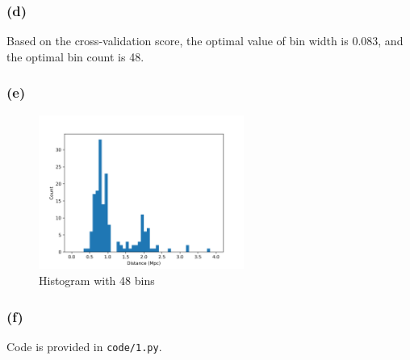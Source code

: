 \subsubsection*{(d)}
Based on the cross-validation score, the optimal value of bin width is 0.083, and the optimal bin count is 48.

\subsubsection*{(e)}
\vspace{-30pt}
\begin{figure}[H]
	\centering
	\includegraphics[width=0.6\textwidth]{images/optimalhistogram.png}
	\caption{Histogram with 48 bins}
\end{figure}

\subsubsection*{(f)}
Code is provided in \texttt{code/1.py}.
